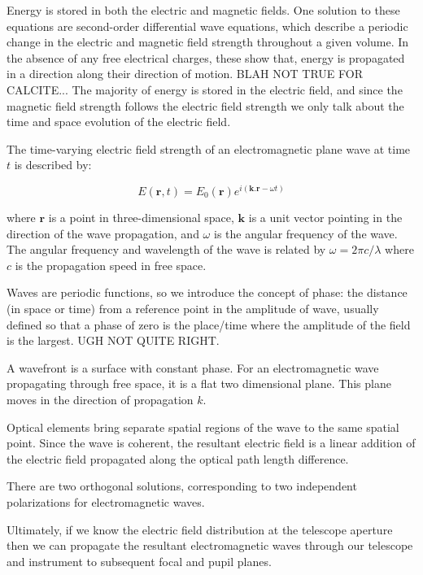 \documentclass[letterpaper]{ar-1col}
\begin{document}
Energy is stored in both the electric and magnetic fields.
One solution to these equations are second-order differential wave equations, which describe a periodic change in the electric and magnetic field strength throughout a given volume.
%
In the absence of any free electrical charges, these show that, energy is propagated in a direction along their direction of motion. BLAH NOT TRUE FOR CALCITE...
The majority of energy is stored in the electric field, and since the magnetic field strength follows the electric field strength we only talk about the time and space evolution of the electric field.

The time-varying electric field strength of an electromagnetic plane wave at time $t$ is described by:

$$E(\mathbf{r},t)=E_0(\mathbf{r})e^{i(\mathbf{k}.\mathbf{r}-\omega t)}$$

where $\mathbf{r}$ is a point in three-dimensional space, $\mathbf{k}$ is a unit vector pointing in the direction of the wave propagation, and $\omega$ is the angular frequency of the wave.
%
The angular frequency and wavelength of the wave is related by $\omega = 2\pi c/\lambda$ where $c$ is the propagation speed in free space.
%

Waves are periodic functions, so we introduce the concept of phase: the distance (in space or time) from a reference point in the amplitude of wave, usually defined so that a phase of zero is the place/time where the amplitude of the field is the largest. UGH NOT QUITE RIGHT. 

A wavefront is a surface with constant phase.
%
For an electromagnetic wave propagating through free space, it is a flat two dimensional plane.
%
This plane moves in the direction of propagation $k$.

Optical elements bring separate spatial regions of the wave to the same spatial point.
%
Since the wave is coherent, the resultant electric field is a linear addition of the electric field propagated along the optical path length difference.
%

There are two orthogonal solutions, corresponding to two independent polarizations for electromagnetic waves.

Ultimately, if we know the electric field distribution at the telescope aperture then we can propagate the resultant electromagnetic waves through our telescope and instrument to subsequent focal and pupil planes.
\end{document}
